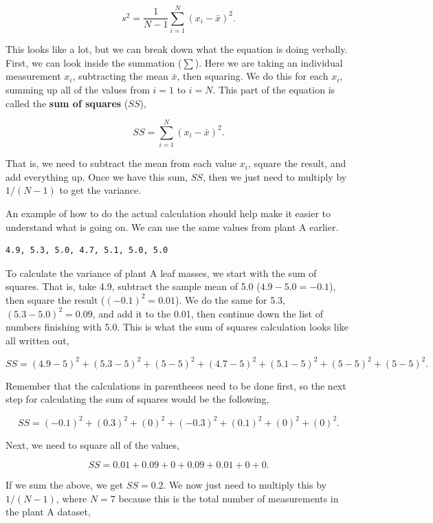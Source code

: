 \documentclass[
]{scrbook}
\begin{document}
\[s^{2} = \frac{1}{N - 1}\sum_{i = 1}^{N}\left(x_{i} - \bar{x} \right)^{2}.\]

This looks like a lot, but we can break down what the equation is doing verbally.
First, we can look inside the summation (\(\sum\)).
Here we are taking an individual measurement \(x_{i}\), subtracting the mean \(\bar{x}\), then squaring.
We do this for each \(x_{i}\), summing up all of the values from \(i = 1\) to \(i = N\).
This part of the equation is called the \textbf{sum of squares} (\(SS\)),

\[SS = \sum_{i = 1}^{N}\left(x_{i} - \bar{x} \right)^{2}.\]

That is, we need to subtract the mean from each value \(x_{i}\), square the result, and add everything up.
Once we have this sum, \(SS\), then we just need to multiply by \(1 / (N - 1)\) to get the variance.

An example of how to do the actual calculation should help make it easier to understand what is going on.
We can use the same values from plant A earlier.

\begin{verbatim}
4.9, 5.3, 5.0, 4.7, 5.1, 5.0, 5.0
\end{verbatim}

To calculate the variance of plant A leaf masses, we start with the sum of squares.
That is, take 4.9, subtract the sample mean of 5.0 (\(4.9 - 5.0 = -0.1\)), then square the result (\((-0.1)^{2} = 0.01\)).
We do the same for 5.3, \((5.3 - 5.0)^{2} = 0.09\), and add it to the 0.01, then continue down the list of numbers finishing with 5.0.
This is what the sum of squares calculation looks like all written out,

\[SS = (4.9 - 5)^{2} + (5.3 - 5)^{2} + (5 - 5)^{2} + (4.7 - 5)^{2} + (5.1 - 5)^{2} + (5 - 5)^{2} + (5 - 5)^{2}.\]

Remember that the calculations in parentheses need to be done first, so the next step for calculating the sum of squares would be the following,

\[SS = (-0.1)^{2} + (0.3)^{2} + (0)^{2} + (-0.3)^{2} + (0.1)^{2} + (0)^{2} + (0)^{2}.\]

Next, we need to square all of the values,

\[SS = 0.01 + 0.09 + 0 + 0.09 + 0.01 + 0 + 0.\]

If we sum the above, we get \(SS = 0.2\).
We now just need to multiply this by \(1 / (N - 1)\), where \(N = 7\) because this is the total number of measurements in the plant A dataset,
\end{document}
